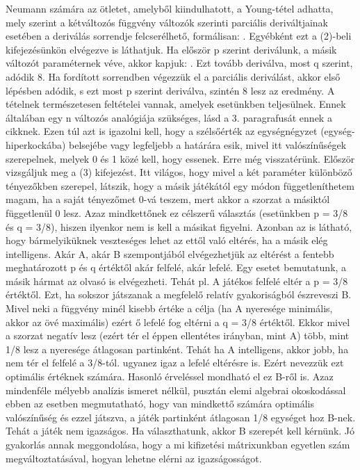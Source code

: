 \documentclass  {article}
\begin{document}
Neumann számára az ötletet, amelyből kiindulhatott, a Young-tétel adhatta, mely szerint a kétváltozós függvény változók szerinti parciális deriváltjainak esetében a deriválás sorrendje felcserélhető, formálisan:  . Egyébként ezt a (2)-beli kifejezésünkön elvégezve is láthatjuk. Ha először p szerint deriválunk, a másik változót paraméternek véve, akkor kapjuk:   . Ezt tovább deriválva, most q szerint, adódik 8. Ha fordított sorrendben végezzük el a parciális deriválást, akkor első lépésben    adódik, s ezt most p szerint deriválva, szintén 8 lesz az eredmény.  A tételnek természetesen feltételei vannak, amelyek esetünkben teljesülnek. Ennek általában egy n változós analógiája szükséges, lásd a 3. paragrafusát ennek a cikknek. Ezen túl azt is igazolni kell, hogy a szélsőérték az egységnégyzet (egység-hiperkockába) belsejébe vagy legfeljebb a határára esik, mivel itt valószínűségek szerepelnek, melyek 0 és 1 közé kell, hogy essenek. Erre még visszatérünk.
Először vizsgáljuk meg a (3) kifejezést. Itt világos, hogy mivel a két paraméter különböző tényezőkben szerepel, látszik, hogy a másik játékától egy módon függetleníthetem magam, ha a saját tényezőmet 0-vá teszem, mert akkor a szorzat a másiktól függetlenül 0 lesz. Azaz mindkettőnek ez célszerű választás (esetünkben p = 3/8 és q = 3/8), hiszen ilyenkor nem is kell a másikat figyelni. Azonban az is látható, hogy bármelyiküknek veszteséges lehet az ettől való eltérés, ha a másik elég intelligens. Akár A, akár B szempontjából elvégezhetjük az eltérést a fentebb meghatározott p és q értéktől akár felfelé, akár lefelé. Egy esetet bemutatunk, a másik hármat az olvasó is elvégezheti. Tehát pl. A játékos felfelé eltér a p = 3/8 értéktől. Ezt, ha sokszor játszanak a megfelelő relatív gyakoriságból észreveszi B. Mivel neki a függvény minél kisebb értéke a célja (ha A nyeresége minimális, akkor az övé maximális) ezért ő lefelé fog eltérni a  q = 3/8 értéktől. Ekkor mivel a szorzat negatív lesz (ezért tér el éppen ellentétes irányban, mint A) több, mint 1/8 lesz a nyeresége átlagosan partinként. Tehát ha A intelligens, akkor jobb, ha nem tér el felfelé a 3/8-tól. ugyanez igaz a lefelé eltérésre is. Ezért nevezzük ezt optimális értéknek számára. Hasonló érveléssel mondható el ez B-ről is. Azaz mindenféle mélyebb analízis ismeret nélkül, pusztán elemi algebrai okoskodással ebben az esetben megmutatható, hogy van mindkettő számára optimális valószínűség és ezzel játszva, a játék partinként átlagosan 1/8 egységet hoz B-nek. Tehát a játék nem igazságos. Ha választhatunk, akkor B szerepét kell kérnünk. Jó gyakorlás annak meggondolása, hogy a mi kifizetési mátrixunkban egyetlen szám megváltoztatásával, hogyan lehetne elérni az igazságosságot.
\end{document}

